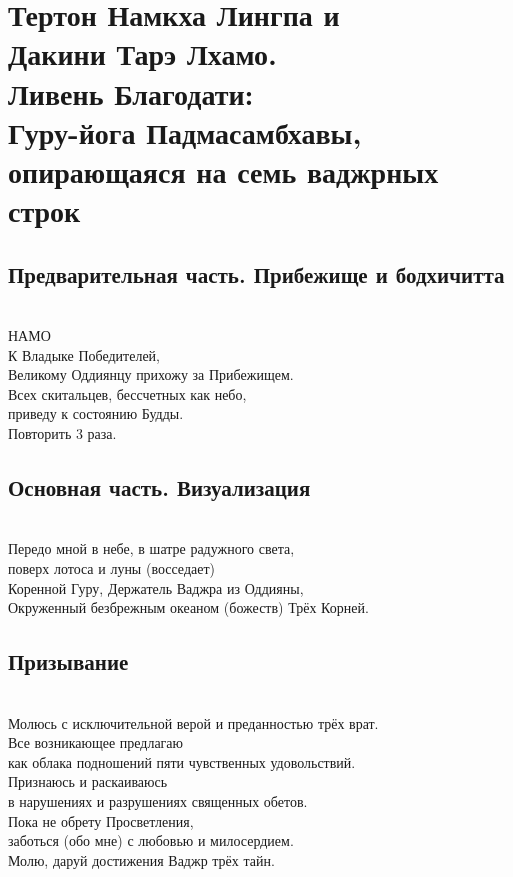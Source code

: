 \section{Тертон Намкха Лингпа и \\ Дакини Тарэ Лхамо.
 \\Ливень Благодати:\\Гуру-йога Падмасамбхавы, \\опирающаяся на семь ваджрных строк}

\subsection{Предварительная часть. Прибежище и бодхичитта}
\\
НАМО\\
К Владыке Победителей, \\
\indent Великому Оддиянцу прихожу за Прибежищем.\\
Всех скитальцев, бессчетных как небо, \\
\indent приведу к состоянию Будды.\\
\scriptsize
Повторить 3 раза.
\normalsize \\

\subsection{Основная часть. Визуализация}
\\
Передо мной в небе, в шатре радужного света, \\ \indent поверх лотоса и луны (восседает)\\
Коренной Гуру, Держатель Ваджра из Оддияны,\\
Окруженный безбрежным океаном (божеств) Трёх Корней.\\

\subsection*{Призывание}
\\
Молюсь с исключительной верой и преданностью трёх врат.\\
Все возникающее предлагаю \\ \indent как облака подношений пяти чувственных удовольствий.\\
Признаюсь и раскаиваюсь \\ \indent в нарушениях и разрушениях священных обетов.\\
Пока не обрету Просветления, \\ \indent заботься (обо мне) с любовью и милосердием.\\
Молю, даруй достижения Ваджр трёх тайн.\\


